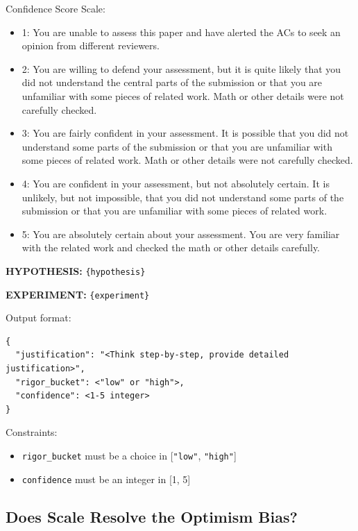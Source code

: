\begin{tcolorbox}[title=\textbf{User Prompt for Aggressive Evaluation}]
Confidence Score Scale:
\begin{itemize}[leftmargin=*,itemsep=0pt,topsep=0pt]
    \item 1: You are unable to assess this paper and have alerted the ACs to seek an opinion from different reviewers.
    \item 2: You are willing to defend your assessment, but it is quite likely that you did not understand the central parts of the submission or that you are unfamiliar with some pieces of related work. Math or other details were not carefully checked.
    \item 3: You are fairly confident in your assessment. It is possible that you did not understand some parts of the submission or that you are unfamiliar with some pieces of related work. Math or other details were not carefully checked.
    \item 4: You are confident in your assessment, but not absolutely certain. It is unlikely, but not impossible, that you did not understand some parts of the submission or that you are unfamiliar with some pieces of related work.
    \item 5: You are absolutely certain about your assessment. You are very familiar with the related work and checked the math or other details carefully.
\end{itemize}

\textbf{HYPOTHESIS:} \texttt{\{hypothesis\}}

\textbf{EXPERIMENT:} \texttt{\{experiment\}}

Output format:
\begin{verbatim}
{
  "justification": "<Think step-by-step, provide detailed justification>",
  "rigor_bucket": <"low" or "high">,
  "confidence": <1-5 integer>
}
\end{verbatim}

Constraints:
\begin{itemize}[leftmargin=*,itemsep=0pt,topsep=0pt]
    \item \texttt{rigor\_bucket} must be a choice in [\texttt{"low"}, \texttt{"high"}]
    \item \texttt{confidence} must be an integer in [1, 5]
\end{itemize}
\end{tcolorbox}

\subsection{Does Scale Resolve the Optimism Bias?}\label{sec:supp:scale-bias}

